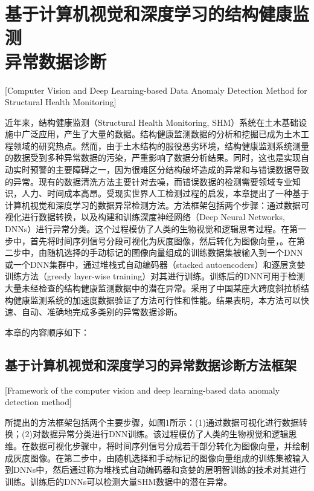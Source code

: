 
\chapter[基于计算机视觉和深度学习的结构健康监测异常数据诊断]{基于计算机视觉和深度学习的结构健康监测\protect\\异常数据诊断}[Computer Vision and Deep Learning-based Data Anomaly Detection Method for Structural Health Monitoring]

近年来，结构健康监测（Structural Health Monitoring, SHM）系统在土木基础设施中广泛应用，产生了大量的数据。结构健康监测数据的分析和挖掘已成为土木工程领域的研究热点。然而，由于土木结构的服役恶劣环境，结构健康监测系统测量的数据受到多种异常数据的污染，严重影响了数据分析结果。同时，这也是实现自动实时预警的主要障碍之一，因为很难区分结构破坏造成的异常和与错误数据导致的异常。现有的数据清洗方法主要针对去噪，而错误数据的检测需要领域专业知识，人力、时间成本高昂。受现实世界人工检测过程的启发，本章提出了一种基于计算机视觉和深度学习的数据异常检测方法。方法框架包括两个步骤：通过数据可视化进行数据转换，以及构建和训练深度神经网络（Deep Neural Networks, DNNs）进行异常分类。这个过程模仿了人类的生物视觉和逻辑思考过程。在第一步中，首先将时间序列信号分段可视化为灰度图像，然后转化为图像向量，。在第二步中，由随机选择的手动标记的图像向量组成的训练数据集被输入到一个DNN或一个DNN集群中，通过堆栈式自动编码器（stacked autoencoders）和逐层贪婪训练方法（greedy layer-wise training）对其进行训练。训练后的DNN可用于检测大量未经检查的结构健康监测数据中的潜在异常。采用了中国某座大跨度斜拉桥结构健康监测系统的加速度数据验证了方法可行性和性能。结果表明，本方法可以快速、自动、准确地完成多类别的异常数据诊断。

本章的内容顺序如下：

\section{基于计算机视觉和深度学习的异常数据诊断方法框架}[Framework of the computer vision and deep learning-based data anomaly detection method]

所提出的方法框架包括两个主要步骤，如图1所示：(1)通过数据可视化进行数据转换；(2)对数据异常分类进行DNN训练。该过程模仿了人类的生物视觉和逻辑思维。在数据可视化步骤中，将时间序列信号分成若干部分转化为图像向量，并绘制成灰度图像。在第二步中，由随机选择和手动标记的图像向量组成的训练集被输入到DNNs中，然后通过称为堆栈式自动编码器和贪婪的层明智训练的技术对其进行训练。训练后的DNNs可以检测大量SHM数据中的潜在异常。

